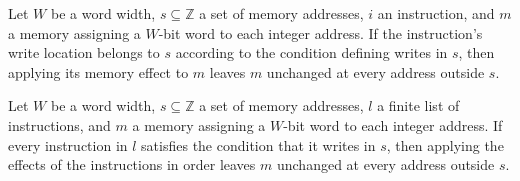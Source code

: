 \begin{theorem}
\label{WordRAM.agreeOutside_effect}
\leanok
{}
Let $W$ be a word width, $s\subseteq\mathbb Z$ a set of memory addresses, $i$ an
instruction, and $m$ a memory assigning a $W$-bit word to each integer address. If the
instruction's write location belongs to $s$ according to the condition defining writes
in $s$, then applying its memory effect to $m$ leaves $m$ unchanged at every address
outside $s$.
\end{theorem}

\begin{theorem}
\label{WordRAM.agreeOutside_effects}
\leanok
{}
Let $W$ be a word width, $s\subseteq\mathbb Z$ a set of memory addresses, $l$ a finite
list of instructions, and $m$ a memory assigning a $W$-bit word to each integer address.
If every instruction in $l$ satisfies the condition that it writes in $s$, then applying
the effects of the instructions in order leaves $m$ unchanged at every address outside
$s$.
\end{theorem}
